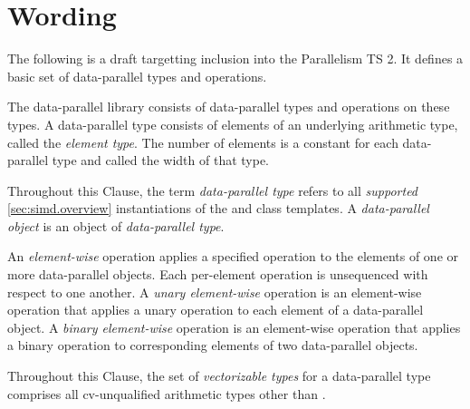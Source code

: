 \section{Wording}

The following is a draft targetting inclusion into the Parallelism TS 2.
It defines a basic set of data-parallel types and operations.

\newcommand\clause{Clause\xspace}
\newcommand\width{width\xspace}

\begin{wgText}
  \setcounter{WGClause}{7}
  \pnum
  The data-parallel library consists of data-parallel types and operations on these types.
  A data-parallel type consists of elements of an underlying arithmetic type, called the \emph{element type}.
  The number of elements is a constant for each data-parallel type and called the \width of that type.

  \pnum
  Throughout this \clause, the term \emph{data-parallel type} refers to all \emph{supported} \ref{sec:simd.overview} instantiations of the \simd and \mask class templates.
  A \emph{data-parallel object} is an object of \emph{data-parallel type}.

  \pnum
  An \emph{element-wise} operation applies a specified operation to the elements of one or more data-parallel objects.
  Each per-element operation is unsequenced with respect to one another.
  A \emph{unary element-wise} operation is an element-wise operation that applies a unary operation to each element of a data-parallel object.
  A \emph{binary element-wise} operation is an element-wise operation that applies a binary operation to corresponding elements of two data-parallel objects.

  \pnum Throughout this \clause, the set of \emph{vectorizable types} for a data-parallel type comprises all cv-unqualified arithmetic types other than \bool.

  \pnum \label{cl:intent-note}

  
  
  
\end{wgText}

